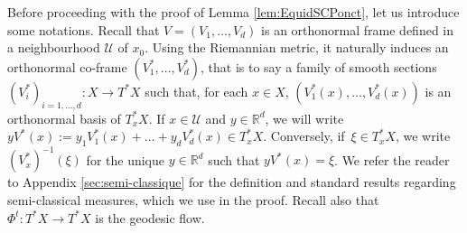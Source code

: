 \documentclass[JEP,XML,SOM,Unicode,published]{cedram}
\let\mathcal\mathscr
\theoremstyle{plain}
\theoremstyle{definition}
\newcommand{\R}{\mathbb{R}}
\def\calU{\mathcal{U}}
\begin{document}
Before proceeding with the proof of Lemma \ref{lem:EquidSCPonct}, let us introduce some notations. Recall that $V=(V_1,\dots,V_d)$ is an orthonormal frame defined in a neighbourhood $\calU$ of $x_0$. Using the Riemannian metric, it naturally induces an orthonormal co-frame $(V_1^*,\dots,V_d^*)$, that is to say a family of smooth sections $(V_i^*)_{i=1,\dots,d} : X\to T^*X$ such that, for each $x\in X$, $(V^*_1(x),\dots,V^*_d(x))$ is an orthonormal basis of $T_x^*X$. If $x\in \mathcal{U}$ and $y\in \R^d$, we will write $yV^*(x) := y_1 V^*_1(x)+\dots +y_d V^*_d(x) \in T_x^*X$. Conversely, if~$\xi \in T_x^*X$, we write $(V_x^*)^{-1}(\xi)$ for the unique $y\in \R^d$ such that $yV^*(x)= \xi$. We refer the reader to Appendix \ref{sec:semi-classique} for the definition and standard results regarding semi-classical measures, which we use in the proof. Recall also that $\Phi^t:T^*X\to T^*X$ is the geodesic flow.\enlargethispage{1.5\baselineskip}%
\end{document}
